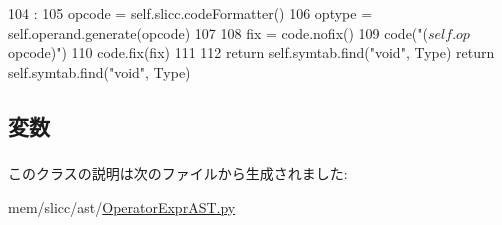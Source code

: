 \begin{DoxyCode}
104                             :
105         opcode = self.slicc.codeFormatter()
106         optype = self.operand.generate(opcode)
107 
108         fix = code.nofix()
109         code("(${{self.op}} $opcode)")
110         code.fix(fix)
111 
112         return self.symtab.find("void", Type)
        return self.symtab.find("void", Type)
\end{DoxyCode}


\subsection{変数}
\hypertarget{classslicc_1_1ast_1_1OperatorExprAST_1_1PrefixOperatorExprAST_a99a30df0f2488360cdd46b4b88e5f5f0}{
\subsubsection[{op}]{}}
\label{classslicc_1_1ast_1_1OperatorExprAST_1_1PrefixOperatorExprAST_a99a30df0f2488360cdd46b4b88e5f5f0}
\hypertarget{classslicc_1_1ast_1_1OperatorExprAST_1_1PrefixOperatorExprAST_ac39fb1c273704df1a4d40c0c585223f3}{
\subsubsection[{operand}]{}}
\label{classslicc_1_1ast_1_1OperatorExprAST_1_1PrefixOperatorExprAST_ac39fb1c273704df1a4d40c0c585223f3}


このクラスの説明は次のファイルから生成されました:\begin{DoxyCompactItemize}
\item 
mem/slicc/ast/\hyperlink{OperatorExprAST_8py}{OperatorExprAST.py}\end{DoxyCompactItemize}
